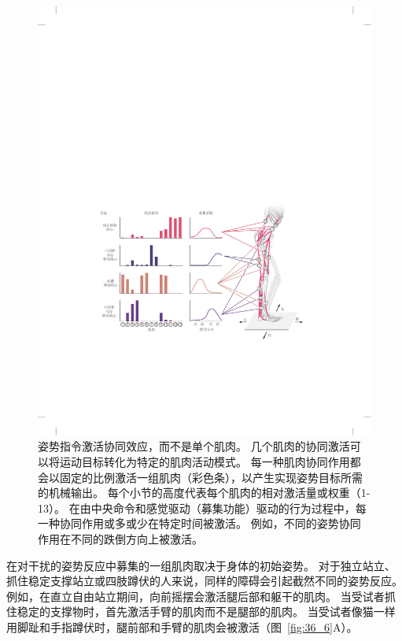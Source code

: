 \begin{figure}[htbp]
	\centering
	\includegraphics[width=1.0\linewidth]{chap36/fig_36_5}
	\caption{姿势指令激活协同效应，而不是单个肌肉。
		几个肌肉的协同激活可以将运动目标转化为特定的肌肉活动模式。
		每一种肌肉协同作用都会以固定的比例激活一组肌肉（彩色条），以产生实现姿势目标所需的机械输出。
		每个小节的高度代表每个肌肉的相对激活量或权重（1-13）。
		在由中央命令和感觉驱动（募集功能）驱动的行为过程中，每一种协同作用或多或少在特定时间被激活。
		例如，不同的姿势协同作用在不同的跌倒方向上被激活。}
	\label{fig:36_5}
\end{figure}


在对干扰的姿势反应中募集的一组肌肉取决于身体的初始姿势。
对于独立站立、抓住稳定支撑站立或四肢蹲伏的人来说，同样的障碍会引起截然不同的姿势反应。
例如，在直立自由站立期间，向前摇摆会激活腿后部和躯干的肌肉。
当受试者抓住稳定的支撑物时，首先激活手臂的肌肉而不是腿部的肌肉。
当受试者像猫一样用脚趾和手指蹲伏时，腿前部和手臂的肌肉会被激活（图~\ref{fig:36_6}A）。


